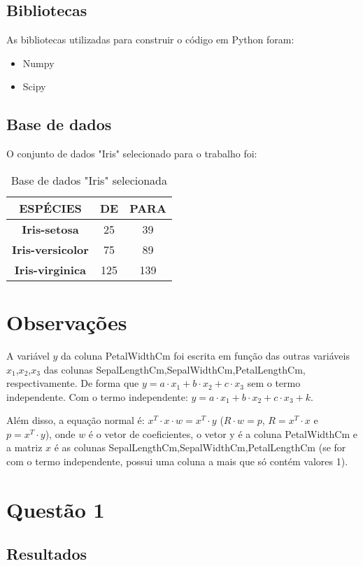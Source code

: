\documentclass[a4paper,12pt,twoside]{article}
\begin{document}
\subsection{Bibliotecas}
As bibliotecas utilizadas para construir o código em Python foram:
\begin{itemize}
   \item Numpy
   \item Scipy
 \end{itemize}
 \subsection{Base de dados}
 O  conjunto de dados "Iris" selecionado para o trabalho foi:
 \begin{table}[H]
\begin{tabular}{|c|c|c|} \hline
\textbf{ESPÉCIES} & DE & PARA \\\hline
\textbf{Iris-setosa}  & 25 & 39 \\\hline
\textbf{Iris-versicolor} & 75 & 89  \\\hline
\textbf{Iris-virginica} & 125 & 139 \\\hline

 
\end{tabular}
\label{tabela2}
\centering
\caption{Base de dados "Iris" selecionada}
\label {tabela2}
\end{table}

\section{Observações}
A variável $y$ da coluna PetalWidthCm foi escrita em função das outras variáveis $x_{1}$,$x_{2}$,$x_{3}$ das colunas SepalLengthCm,SepalWidthCm,PetalLengthCm, respectivamente. De forma que 
$y= a\cdot x_{1} +b\cdot x_{2}+c\cdot x_{3}$ sem o termo independente. Com o termo independente: $y= a\cdot x_{1} +b\cdot x_{2}+c\cdot x_{3} +k$.

    Além disso, a equação normal é: $x^{T}\cdot x\cdot w=x^{T}\cdot y$ ($R\cdot w=p$, $R=x^{T}\cdot x$ e $p = x^{T}\cdot y$), onde $w$ é o vetor de coeficientes, o vetor y é a coluna PetalWidthCm e a matriz $x$ é as colunas SepalLengthCm,SepalWidthCm,PetalLengthCm (se for com o termo independente, possui uma coluna a mais que só contém valores 1).


\section{Questão 1}
\subsection{Resultados}
\end{document}
